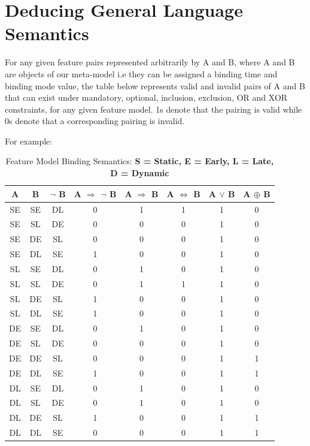 \documentclass{article}
\begin{document}
\section{Deducing General Language Semantics}

For any given feature pairs represented arbitrarily by A and B, where A and B are objects of our meta-model i.e they can be assigned a binding time and binding mode value, the table below represents valid and invalid pairs of A and B that can exist under mandatory, optional, inclusion, exclusion, OR and  XOR constraints, for any given feature model. 1s denote that the pairing is valid while 0s denote that a corresponding pairing is invalid.

For example: 

\begin{table}[H]
	\caption{Feature Model Binding Semantics: \textbf{S = Static, E = Early, L = Late, D = Dynamic}}
	\centering
	\begin{center}
		\begin{tabular}{c c c c c c c c}
			\hline
			A & B & $ \neg$ B & A $ \Rightarrow $ $ \neg $ B & A $ \Rightarrow $ B & A $ \Leftrightarrow $ B & A $\vee$ B & A $\oplus$ B\\\hline
			SE & SE & DL & 0 & 1 & 1 & 1 & 0 \\ \hline
			SE & SL & DE & 0 & 0 & 0 & 1 & 0 \\ \hline
			SE & DE & SL & 0 & 0 & 0 & 1 & 0 \\ \hline
			SE & DL & SE & 1 & 0 & 0 & 1 & 0 \\ \hline
			
			SL & SE & DL & 0 & 1 & 0 & 1 & 0 \\ \hline 
			SL & SL & DE & 0 & 1 & 1 & 1 & 0 \\ \hline
			SL & DE & SL & 1 & 0 & 0 & 1 & 0 \\ \hline
			SL & DL & SE & 1 & 0 & 0 & 1 & 0 \\ \hline
			
			DE & SE & DL & 0 & 1 & 0 & 1 & 0 \\ \hline
			DE & SL & DE & 0 & 0 & 0 & 1 & 0 \\ \hline
			DE & DE & SL & 0 & 0 & 0 & 1 & 1 \\ \hline
			DE & DL & SE & 1 & 0 & 0 & 1 & 1 \\ \hline
			
			DL & SE & DL & 0 & 1 & 0 & 1 & 0\\ \hline
			DL & SL & DE & 0 & 1 & 0 & 1 & 0\\ \hline
			DL & DE & SL & 1 & 0 & 0 & 1 & 1 \\ \hline
			DL & DL & SE & 0 & 0 & 0 & 1 & 1 \\ \hline
			
		\end{tabular}
		\label{tab:timoconf}
	\end{center}
\end{table}
\end{document}
